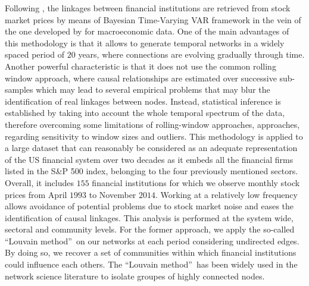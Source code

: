 \documentclass[a4paper,10pt]{article}
\begin{document}
Following \cite{Geraci}, the linkages  between financial institutions  are retrieved from stock market prices by means of
Bayesian Time-Varying VAR framework in the vein of the one developed by \cite{Primiceri} for macroeconomic data.  One of the 
main advantages of this methodology is that it allows to generate temporal networks in a widely spaced period of $20$ years, 
where connections are evolving gradually through time. Another powerful characteristic is that it does not use the common
rolling window approach, where causal relationships are estimated over successive sub-samples which may lead to several 
empirical problems that may blur the identification of real linkages between nodes. Instead, statistical inference is
established by taking into account the whole temporal spectrum of the data, therefore overcoming some limitations of 
rolling-window approaches, approaches, regarding sensitivity to window sizes and outliers. This methodology is applied to a
large dataset that can reasonably be considered as an adequate representation of the US financial system over two decades as 
it embeds all the financial firms listed in the S\&P 500 index, belonging to the four previously mentioned sectors. Overall, 
it includes $155$ financial institutions for which we observe monthly stock prices from April $1993$ to November $2014$. Working at a 
relatively low frequency allows avoidance of potential problems due to stock market noise and eases the identification of
causal linkages.  This analysis is performed at the system wide, sectoral and community levels. For the former approach, we apply the so-called \textquotedblleft Louvain method\textquotedblright\ on our networks at each period considering undirected edges. By doing so, we recover a set of communities within which financial  institutions could influence each others. The \textquotedblleft Louvain method\textquotedblright\    has been widely used in the network science literature to isolate groupes of highly connected nodes. 
\end{document}
